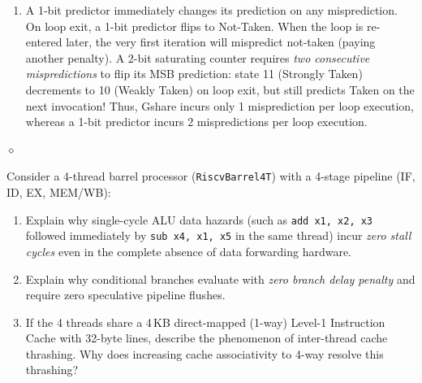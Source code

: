 \begin{problem}
\begin{enumerate}
    \item A 1-bit predictor immediately changes its prediction on any misprediction. On loop exit, a 1-bit predictor flips to Not-Taken. When the loop is re-entered later, the very first iteration will mispredict not-taken (paying another penalty). A 2-bit saturating counter requires \textit{two consecutive mispredictions} to flip its MSB prediction: state 11 (Strongly Taken) decrements to 10 (Weakly Taken) on loop exit, but still predicts Taken on the next invocation! Thus, Gshare incurs only 1 misprediction per loop execution, whereas a 1-bit predictor incurs 2 mispredictions per loop execution.
\end{enumerate}
$\diamond$
\end{problem}

\begin{problem}
Consider a 4-thread barrel processor (\texttt{RiscvBarrel4T}) with a 4-stage pipeline (IF, ID, EX, MEM/WB):
\begin{enumerate}
    \item Explain why single-cycle ALU data hazards (such as \texttt{add x1, x2, x3} followed immediately by \texttt{sub x4, x1, x5} in the same thread) incur \textit{zero stall cycles} even in the complete absence of data forwarding hardware.
    \item Explain why conditional branches evaluate with \textit{zero branch delay penalty} and require zero speculative pipeline flushes.
    \item If the 4 threads share a 4\,KB direct-mapped (1-way) Level-1 Instruction Cache with 32-byte lines, describe the phenomenon of inter-thread cache thrashing. Why does increasing cache associativity to 4-way resolve this thrashing?
\end{enumerate}


\end{problem}
